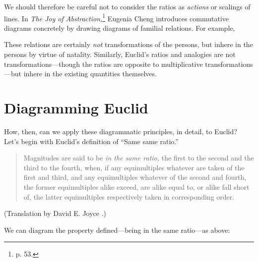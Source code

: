 \documentclass[11pt]{article}
\newcommand{\flushleftright}{\noindent\justifying}
\begin{document}
\centering%
\qquad
{}

\flushleftright
We should therefore be careful not to consider the ratios as \textit{actions} or scalings of lines. In \textit{The Joy of Abstraction,}\footnote{p. 53.} Eugenia Cheng \citep{cheng2022} introduces commutative diagrams concretely by drawing diagrams of familial relations. For example, 

\centering%

\flushleftright%
These relations are certainly \textit{not} transformations of the persons, but inhere in the persons by virtue of natality. Similarly, Euclid's ratios and analogies are not transformations---though the ratios are opposite to multiplicative transformations---but inhere in the existing quantities themselves.

\section{Diagramming Euclid}
How, then, can we apply these diagrammatic principles, in detail, to Euclid? Let's begin with Euclid's definition of ``Same same ratio.''

\begin{quote}
Magnitudes are said to be \textit{in the same ratio,} the first to the second and the third to the fourth, when, if any equimultiples whatever are taken of the first and third, and any equimultiples whatever of the second and fourth, the former equimultiples alike exceed, are alike equal to, or alike fall short of, the latter equimultiples respectively taken in corresponding order.
\end{quote}

(Translation by David E. Joyce \citep{joyce-elements}.)

We can diagram the property defined---being in the same ratio---as above:
\end{document}
